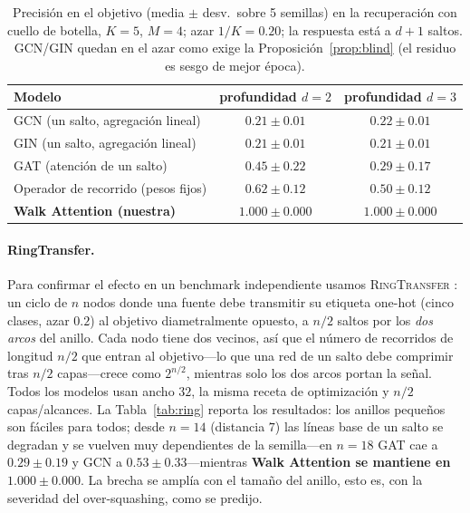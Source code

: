 \documentclass[runningheads]{llncs}
\begin{document}
\begin{table}[t]
\centering
\caption{Precisión en el objetivo (media $\pm$ desv.\ sobre 5 semillas) en la
recuperación con cuello de botella, $K{=}5$, $M{=}4$; azar $1/K=0.20$; la
respuesta está a $d{+}1$ saltos. GCN/GIN quedan en el azar como exige la
Proposición~\ref{prop:blind} (el residuo es sesgo de mejor época).}
\label{tab:main}
\begin{tabular}{lcc}
\toprule
\textbf{Modelo} & \textbf{profundidad $d=2$} & \textbf{profundidad $d=3$} \\
\midrule
GCN (un salto, agregación lineal)    & $0.21\pm0.01$ & $0.22\pm0.01$ \\
GIN (un salto, agregación lineal)    & $0.21\pm0.01$ & $0.21\pm0.01$ \\
GAT (atención de un salto)            & $0.45\pm0.22$ & $0.29\pm0.17$ \\
Operador de recorrido (pesos fijos)      & $0.62\pm0.12$ & $0.50\pm0.12$ \\
\textbf{Walk Attention (nuestra)}     & $\mathbf{1.000\pm0.000}$ & $\mathbf{1.000\pm0.000}$ \\
\bottomrule
\end{tabular}
\end{table}

\paragraph{RingTransfer.}
Para confirmar el efecto en un benchmark independiente usamos
\textsc{RingTransfer}
\cite{bodnar2021cw,digiovanni2023oversquashing}: un ciclo de $n$ nodos donde una fuente debe
transmitir su etiqueta one-hot (cinco clases, azar $0.2$) al objetivo
diametralmente opuesto, a $n/2$ saltos por los \emph{dos arcos} del anillo.
Cada nodo tiene dos vecinos, así que el número de recorridos de longitud $n/2$
que entran al objetivo---lo que una red de un salto debe comprimir tras $n/2$
capas---crece como $2^{n/2}$, mientras solo los dos arcos portan la señal.
Todos los modelos usan ancho $32$, la misma receta de optimización y $n/2$
capas/alcances. La Tabla~\ref{tab:ring} reporta los resultados: los anillos
pequeños son fáciles para todos; desde $n{=}14$ (distancia $7$) las líneas base
de un salto se degradan y se vuelven muy dependientes de la semilla---en
$n{=}18$ GAT cae a $0.29\pm0.19$ y GCN a $0.53\pm0.33$---mientras
\textbf{Walk Attention se mantiene en $1.000\pm0.000$}. La brecha se amplía con
el tamaño del anillo, esto es, con la severidad del over-squashing, como se
predijo.
\end{document}
